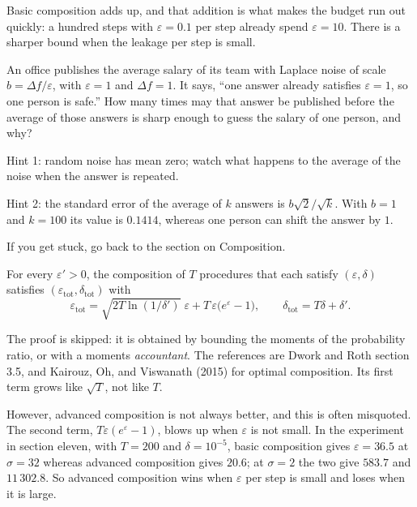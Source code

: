 Basic composition adds up, and that addition is what makes the budget run out quickly: a
hundred steps with $\varepsilon=0.1$ per step already spend $\varepsilon=10$. There is a
sharper bound when the leakage per step is small.

\begin{tantangan}
An office publishes the average salary of its team with Laplace noise of scale
$b=\Delta f/\varepsilon$, with $\varepsilon=1$ and $\Delta f=1$. It says, ``one answer
already satisfies $\varepsilon=1$, so one person is safe.'' How many times may that
answer be published before the average of those answers is sharp enough to guess the
salary of one person, and why?

Hint 1: random noise has mean zero; watch what happens to the average of the noise when
the answer is repeated.

Hint 2: the standard error of the average of $k$ answers is $b\sqrt{2}/\sqrt{k}$. With
$b=1$ and $k=100$ its value is $0.1414$, whereas one person can shift the answer by $1$.

If you get stuck, go back to the section on Composition.
\end{tantangan}

\begin{teorema}
For every $\varepsilon'>0$, the composition of $T$ procedures that each satisfy
$(\varepsilon,\delta)$ satisfies $(\varepsilon_{\mathrm{tot}},\delta_{\mathrm{tot}})$
with
\begin{equation}
\varepsilon_{\mathrm{tot}} = \sqrt{2T\ln(1/\delta')}\;\varepsilon
+ T\,\varepsilon\bigl(e^{\varepsilon}-1\bigr),
\qquad
\delta_{\mathrm{tot}} = T\delta + \delta' .
\end{equation}
\end{teorema}

The proof is skipped: it is obtained by bounding the moments of the probability ratio, or
with a moments \emph{accountant}. The references are Dwork and Roth section 3.5, and
Kairouz, Oh, and Viswanath (2015) for optimal composition. Its first term grows like
$\sqrt{T}$, not like $T$.

However, advanced composition is not always better, and this is often misquoted. The
second term, $T\varepsilon(e^{\varepsilon}-1)$, blows up when $\varepsilon$ is not small.
In the experiment in section eleven, with $T=200$ and $\delta=10^{-5}$, basic composition
gives $\varepsilon=36.5$ at $\sigma=32$ whereas advanced composition gives $20.6$; at
$\sigma=2$ the two give $583.7$ and $11\,302.8$. So advanced composition wins when
$\varepsilon$ per step is small and loses when it is large.

